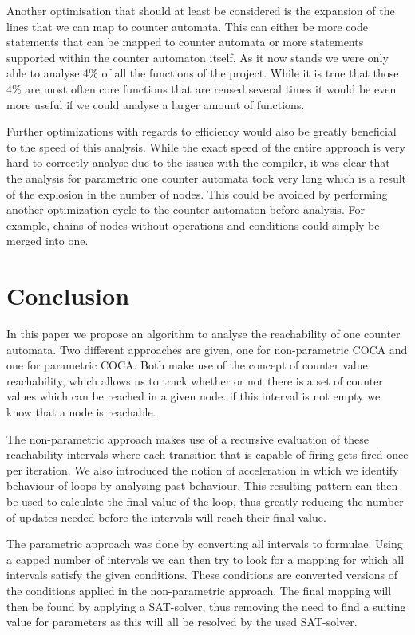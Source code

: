 \documentclass[12pt]{thesis}
\begin{document}
Another optimisation that should at least be considered is the expansion of the lines that we can map to counter automata. This can either be more code statements that can be mapped to counter automata or more statements supported within the counter automaton itself. As it now stands we were only able to analyse 4\% of all the functions of the project. While it is true that those 4\% are most often core functions that are reused several times it would be even more useful if we could analyse a larger amount of functions.

Further optimizations with regards to efficiency would also be greatly beneficial to the speed of this analysis. While the exact speed of the entire approach is very hard to correctly analyse due to the issues with the compiler, it was clear that the analysis for parametric one counter automata took very long which is a result of the explosion in the number of nodes. This could be avoided by performing another optimization cycle to the counter automaton before analysis. For example, chains of nodes without operations and conditions could simply be merged into one.

\chapter{Conclusion}
In this paper we propose an algorithm to analyse the reachability of one counter automata. Two different approaches are given, one for non-parametric COCA and one for parametric COCA. Both make use of the concept of counter value reachability, which allows us to track whether or not there is a set of counter values which can be reached in a given node. if this interval is not empty we know that a node is reachable.

The non-parametric approach makes use of a recursive evaluation of these reachability intervals where each transition that is capable of firing gets fired once per iteration. We also introduced the notion of acceleration in which we identify behaviour of loops by analysing past behaviour. This resulting pattern can then be used to calculate the final value of the loop, thus greatly reducing the number of updates needed before the intervals will reach their final value.

The parametric approach was done by converting all intervals to formulae. Using a capped number of intervals we can then try to look for a mapping for which all intervals satisfy the given conditions. These conditions are converted versions of the conditions applied in the non-parametric approach. The final mapping will then be found by applying a SAT-solver, thus removing the need to find a suiting value for parameters as this will all be resolved by the used SAT-solver.
\end{document}
